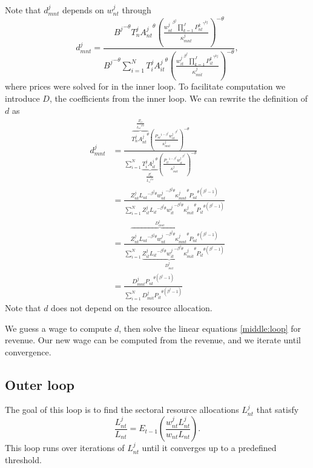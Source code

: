 \documentclass[12pt]{article}
\begin{document}
Note that $d^j_{mnt}$ depends on $w_{nt}^j$ through
$$d_{mnt}^j = \frac{{B^j}^{-\theta} T_n^j {A_{nt}^j}^{\theta} \left(\frac{{w_{nt}^j}^{\beta^j} \prod_{k = 1}^{J}{P_{nt}^k}^{\gamma^{kj}} }{\kappa_{mnt}^j}\right)^{-\theta}}{{B^j}^{-\theta} \sum_{i = 1}^N T_i^j {A_{it}^j}^{\theta} \left(\frac{{w_{it}^j}^{\beta^j} \prod_{k = 1}^{J}{P_{it}^k}^{\gamma^{kj}} }{\kappa_{mit}^j}\right)^{-\theta}},$$
where prices were solved for in the inner loop. To facilitate computation we introduce $D$, the coefficients from the inner loop.
We can rewrite the definition of $d$ as
\begin{align*}
  d_{mnt}^j &= \frac{\overbrace{T_n^j {A_{nt}^j}^{\theta}}^{\frac{Z_{nt}^j}{{L_{nt}}^{\beta^j\theta}}} \left(\frac{{P_{nt}}^{1 - \beta^j} {w_{nt}^j}^{\beta^j}}{\kappa_{mnt}^j}\right)^{-\theta}}{\sum_{i = 1}^N \underbrace{T_i^j {A_{it}^j}^{\theta}}_{\frac{Z_{it}^j}{{L_{it}}^{\beta^j\theta}}} \left(\frac{{P_{it}}^{1 - \beta^j} {w_{it}^j}^{\beta^j}}{\kappa_{mit}^j}\right)^{-\theta}}\\
%
  &= \frac{Z_{nt}^j {L_{nt}}^{- \beta^j\theta} {w_{nt}^j}^{-\beta^j\theta} {\kappa_{mnt}^j}^{\theta}{P_{nt}}^{\theta(\beta^j - 1)}}{\sum_{i = 1}^N Z_{it}^j {L_{it}}^{- \beta^j\theta} {w_{it}^j}^{-\beta^j\theta} {\kappa_{mit}^j}^{\theta}{P_{it}}^{\theta(\beta^j - 1)}}\\
%
  &= \frac{\overbrace{Z_{nt}^j {L_{nt}}^{- \beta^j\theta} {w_{nt}^j}^{-\beta^j\theta} {\kappa_{mnt}^j}^{\theta}}^{D_{mnt}^j}{P_{nt}}^{\theta(\beta^j - 1)}}{\sum_{i = 1}^N \underbrace{Z_{it}^j {L_{it}}^{- \beta^j\theta} {w_{it}^j}^{-\beta^j\theta} {\kappa_{mit}^j}^{\theta}}_{D_{mit}^j}{P_{it}}^{\theta(\beta^j - 1)}}\\
%
  &= \frac{D_{mnt}^j {P_{nt}}^{\theta(\beta^j - 1)}}{\sum_{i = 1}^N D_{mit}^j{P_{it}}^{\theta(\beta^j - 1)}}
\end{align*}
Note that $d$ does not depend on the resource allocation.

We guess a wage to compute $d$, then solve the linear equations \eqref{middle:loop} for revenue. Our new wage can be computed from the revenue, and we iterate until convergence.

\subsection{Outer loop}
The goal of this loop is to find the sectoral resource allocations $L_{nt}^j$ that satisfy
$$\frac{L_{nt}^{j}}{L_{nt}} = E_{t - 1} \left( \frac{w_{nt}^j L_{nt}^j}{w_{nt} L_{nt}}\right).$$
This loop runs over iterations of $L_{nt}^j$ until it converges up to a predefined threshold.
\end{document}
